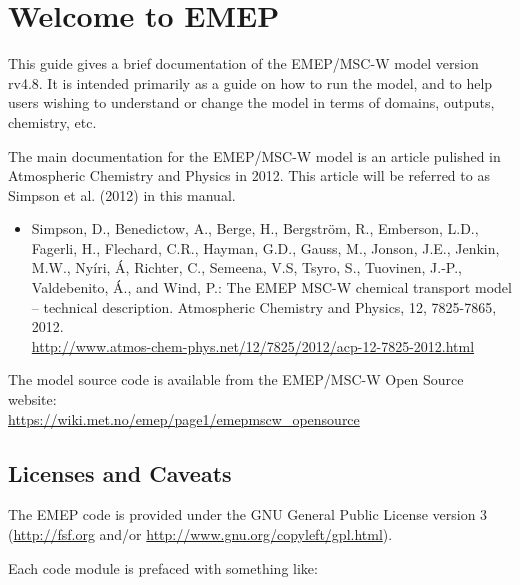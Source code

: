 
\chapter{Welcome to EMEP }

This guide gives a brief documentation of the EMEP/MSC-W model
version rv4.8. 
It is intended primarily as a guide on how to run the model, and
to help users wishing to understand or change 
the model in terms of domains, outputs, chemistry, etc.


The main documentation for the EMEP/MSC-W model is an article pulished 
in Atmospheric Chemistry and Physics in 2012. 
This article will be referred to as Simpson et al. (2012) in
this manual. 


\begin{itemize}
\item
Simpson, D., Benedictow, A., Berge, H., Bergstr\"om, R., Emberson, L.D., Fagerli, H., Flechard, C.R., Hayman, G.D., Gauss, M., Jonson, J.E., Jenkin, M.W., Ny\'iri, \'A, Richter, C., Semeena, V.S, Tsyro, S., Tuovinen, J.-P., Valdebenito, \'A., and Wind, P.:
The EMEP MSC-W chemical transport model – technical description.  
Atmospheric Chemistry and Physics, 12, 7825-7865, 2012. \\
\url{http://www.atmos-chem-phys.net/12/7825/2012/acp-12-7825-2012.html}
\end{itemize}


The model source code is available from the EMEP/MSC-W Open Source website:\\ 
\url{https://wiki.met.no/emep/page1/emepmscw_opensource}

\newpage

\section{Licenses and Caveats}

The EMEP code is provided under the GNU General Public License version 3
(\url{http://fsf.org} and/or
\url{http://www.gnu.org/copyleft/gpl.html}).

Each code module is prefaced with something like:\\
\bigskip


